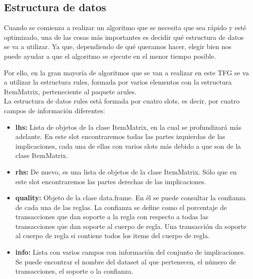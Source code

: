 \subsection{Estructura de datos}

Cuando se comienza a realizar un algoritmo que se necesita que 
sea r\'apido y est\'e optimizado, una de las cosas m\'as importantes 
es decidir qu\'e estructura de datos se va a utilizar.
Ya que, dependiendo de qu\'e queramos hacer, elegir bien nos puede 
ayudar a que el algoritmo se ejecute en el menor tiempo posible.

Por ello, en la gran mayor\'ia de algoritmos que se van a realizar 
en este TFG se va a utilizar la estructura rules, formada por varios 
elementos con la estructura ItemMatrix, perteneciente al paquete 
arules.
\\

La estructura de datos rules est\'a formada por cuatro slots, es decir, por 
cuatro campos de informaci\'on diferentes:

\begin{itemize}
    \item \textbf{lhs:}
    Lista de objetos de la clase ItemMatrix, en la cual se profundizar\'a m\'as 
    adelante. En este slot encontraremos todas las partes izquierdas de las 
    implicaciones, cada una de ellas con varios slots m\'as debido a que son de la 
    clase ItemMatrix. 

    \item \textbf{rhs:}
    De nuevo, es una lista de objetos de la clase ItemMatrix. S\'olo que en este 
    slot encontraremos las partes derechas de las implicaciones.

    \item \textbf{quality:}
    Objeto de la clase data.frame. En \'el se puede consultar la confianza de cada 
    una de las reglas. La confianza se define como el porcentaje de transacciones 
    que dan soporte a la regla con respecto a todas las transacciones que dan 
    soporte al cuerpo de regla. Una transacci\'on da soporte al cuerpo de regla si 
    contiene todos los items del cuerpo de regla.

    \item \textbf{info:}
    Lista con varios campos con informaci\'on del conjunto de implicaciones. Se puede 
    encontrar el nombre del dataset al que pertenecen, el n\'umero de transacciones, 
    el soporte o la confianza.

\end{itemize}


